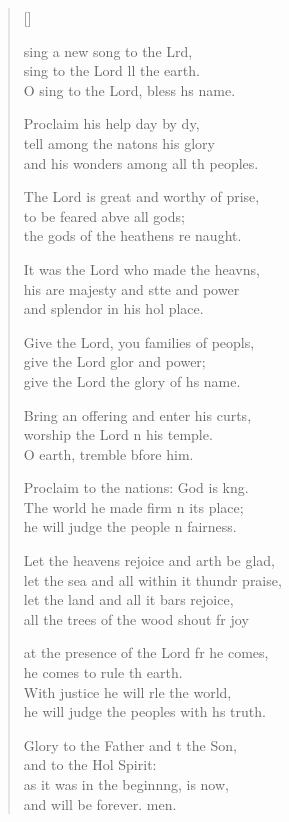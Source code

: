 \settowidth{\versewidth}{let the sea and all within it thunder praise,}
\begin{verse}[\versewidth]
  \begin{patverse}
 sing a new song to the Lrd,\Flex\\
sing to the Lord ll the earth.\Med\\
O sing to the Lord, bless h\pointup{\i}s name.

Proclaim his help day by dy,\Flex\\
tell among the nat\pointup{\i}ons his glory\Med\\
and his wonders among all th peoples.

The Lord is great and worthy of prise,\Flex\\
to be feared abve all gods;\Med\\
the gods of the heathens re naught.

It was the Lord who made the heavns,\Flex\\
his are majesty and stte and power\Med\\
and splendor in his hol place.

Give the Lord, you families of peopls,\Flex\\
give the Lord glor and power;\Med\\
give the Lord the glory of h\pointup{\i}s name.

Bring an offering and enter his curts,\Flex\\
worship the Lord \pointup{\i}n his temple.\Med\\
O earth, tremble bfore him.

Proclaim to the nations: God is k\pointup{\i}ng.\Flex\\
The world he made firm \pointup{\i}n its place;\Med\\
he will judge the people \pointup{\i}n fairness.

Let the heavens rejoice and arth be glad,\Med\\
let the sea and all within it thundr praise,\\
let the land and all it bars rejoice,\Med\\
all the trees of the wood shout fr joy

at the presence of the Lord fr he comes,\Med\\
he comes to rule th earth.\\
With justice he will rle the world,\Med\\
he will judge the peoples with h\pointup{\i}s truth.

Glory to the Father and t the Son,\Med\\
and to the Hol Spirit:\\
as it was in the beginn\pointup{\i}ng, is now,\Med\\
and will be forever. men. 
  \end{patverse}
\end{verse}
